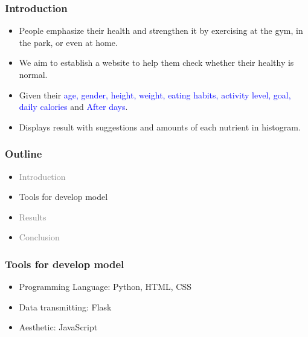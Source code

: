 \documentclass[fleqn]{beamer}
\begin{document}
\begin{frame}
\frametitle{Introduction}
\begin{itemize}
    \item People emphasize their health and strengthen it by exercising at the gym, in the park, or even at home.
    \vspace{0.15 cm}
    \item We aim to establish a website to help them check whether their \alert{healthy} is normal.
    \vspace{0.15 cm}
    \item Given their \textcolor{blue}{age, gender, height, weight, eating habits, activity level, goal, daily calories} and \textcolor{blue}{After days}. 
    \vspace{0.15 cm}
    \item Displays result with suggestions and amounts of each nutrient in histogram.
    \vspace{0.15 cm}
\end{itemize}
\end{frame}
\begin{frame}
\frametitle{Outline}
\begin{itemize}
        \item \textcolor{gray}{Introduction}
        \vspace{0.15 cm}
        \item Tools for develop model
        \vspace{0.15 cm}
        \item \textcolor{gray}{Results}
        \vspace{0.15 cm}
        \item \textcolor{gray}{Conclusion}
        \vspace{0.15 cm}
\end{itemize}
\end{frame}
\begin{frame}
\frametitle{Tools for develop model}
\begin{itemize}
    \item Programming Language: Python, HTML, CSS \\
    \vspace{0.15 cm}
    \item Data transmitting: Flask \\
    \vspace{0.15 cm}
    \item Aesthetic: JavaScript 
    \vspace{0.15 cm}
\end{itemize}
\end{frame}
\end{document}
